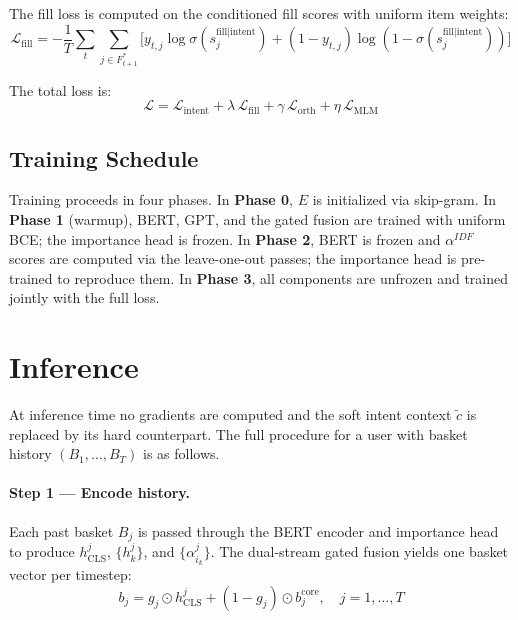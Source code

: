 \documentclass[conference]{IEEEtran}
\begin{document}
The fill loss is computed on the conditioned fill scores with uniform
item weights:
\begin{equation}
\mathcal{L}_{\text{fill}} = -\frac{1}{T}\sum_t
  \sum_{j \in F^*_{t+1}}
  \bigl[y_{t,j}\log\sigma(s_j^{\text{fill}\mid\text{intent}})
       + (1-y_{t,j})\log(1-\sigma(s_j^{\text{fill}\mid\text{intent}}))\bigr]
\end{equation}

The total loss is:
\begin{equation}
\mathcal{L} = \mathcal{L}_{\text{intent}}
            + \lambda\,\mathcal{L}_{\text{fill}}
            + \gamma\,\mathcal{L}_{\text{orth}}
            + \eta\,\mathcal{L}_{\text{MLM}}
\end{equation}

\subsection{Training Schedule}

Training proceeds in four phases. In \textbf{Phase 0}, $E$ is
initialized via skip-gram. In \textbf{Phase 1} (warmup), BERT, GPT,
and the gated fusion are trained with uniform BCE; the importance head
is frozen. In \textbf{Phase 2}, BERT is frozen and $\alpha^{IDF}$
scores are computed via the leave-one-out passes; the importance head
is pre-trained to reproduce them. In \textbf{Phase 3}, all components
are unfrozen and trained jointly with the full loss.


\section{Inference}
\label{sec:inference}

At inference time no gradients are computed and the soft intent context
$\tilde{c}$ is replaced by its hard counterpart. The full procedure
for a user with basket history $(B_1, \ldots, B_T)$ is as follows.

\paragraph{Step 1 --- Encode history.}
Each past basket $B_j$ is passed through the BERT encoder and
importance head to produce $h_{\text{CLS}}^j$, $\{h_k^j\}$, and
$\{\alpha_{i_k}^j\}$. The dual-stream gated fusion yields one
basket vector per timestep:
\begin{equation}
b_j = g_j \odot h_{\text{CLS}}^j + (1 - g_j) \odot b_j^{\text{core}},
\quad j = 1, \ldots, T
\end{equation}
\end{document}
